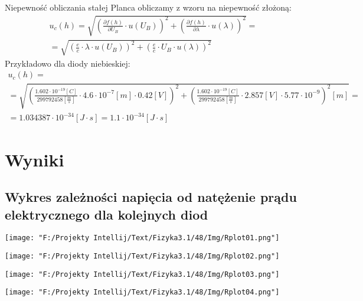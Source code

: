 \documentclass[11pt]{article}
\begin{document}
    Niepewność obliczania stałej Planca obliczamy z wzoru na niepewność złożoną:
    \begin{gather*}
        u_c(h)=\sqrt{(\frac{\partial f(h)}{\partial U_B}\cdot u(U_B))^2+(\frac{\partial f(h)}{\partial \lambda}\cdot u(\lambda))^2}=\\
        =\sqrt{(\frac{e}{c}\cdot\lambda\cdot u(U_B))^2+(\frac{e}{c}\cdot U_B\cdot u(\lambda))^2}
    \end{gather*}
    Przykładowo dla diody niebieskiej:
    \begin{gather*}
        u_c(h)=\\
        =\sqrt{(\frac{1.602\cdot 10^{-19}[C]}{299792458[\frac{m}{s}]}\cdot 4.6\cdot 10^{-7}[m]\cdot 0.42[V])^2+
            (\frac{1.602\cdot 10^{-19}[C]}{299792458[\frac{m}{s}]}\cdot 2.857[V]\cdot 5.77\cdot 10^{-9})^2[m]}=\\
        =1.034387\cdot 10^{-34}[J\cdot s]=1.1\cdot 10^{-34}[J\cdot s]
    \end{gather*}

    \section{Wyniki}
    \subsection*{Wykres zależności napięcia od natężenie prądu elektrycznego dla kolejnych diod}
    \begin{center}
        \texttt{[image: "F:/Projekty Intellij/Text/Fizyka3.1/48/Img/Rplot01.png"]}
    \end{center}
    \begin{center}
        \texttt{[image: "F:/Projekty Intellij/Text/Fizyka3.1/48/Img/Rplot02.png"]}
    \end{center}
    \begin{center}
        \texttt{[image: "F:/Projekty Intellij/Text/Fizyka3.1/48/Img/Rplot03.png"]}
    \end{center}
    \begin{center}
        \texttt{[image: "F:/Projekty Intellij/Text/Fizyka3.1/48/Img/Rplot04.png"]}
    \end{center}
\end{document}

